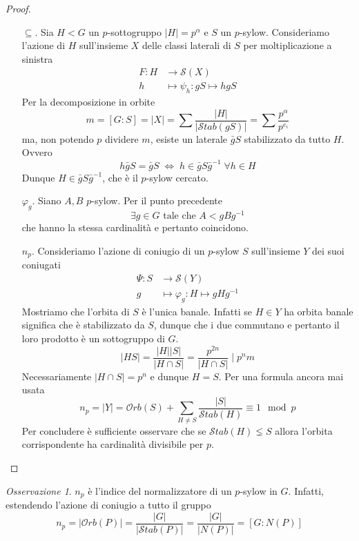 \documentclass[a4paper]{article}
\theoremstyle{remark}
\newtheorem*{remark}{Osservazione}
\theoremstyle{definition}
\newcommand{\Orb}[1]{\mathcal{O}rb\left( #1 \right)}
\newcommand{\Stab}[1]{\mathcal{S}tab\left( #1 \right)}
\newcommand{\fun}[5]{\begin{align*}
	#1 \colon #2 &\to #3 \\
	#4 &\mapsto #5
	\end{align*}}
\begin{document}
\begin{multicols}{2}
\begin{proof}
\begin{itemize}
		\item[$ \subseteq $.] Sia $ H < G $ un $ p $-sottogruppo $ |H| = p^\alpha $ e $ S $ un $ p $-sylow. Consideriamo l'azione di $ H $ sull'insieme $ X $ delle classi laterali di $ S $ per moltiplicazione a sinistra
		\fun{F}{H}{\mathcal{S}(X)}{h}{\psi_h : gS \mapsto hgS}
		Per la decomposizione in orbite
		\[ m=[G:S]=|X| = \sum\frac{|H|}{|\Stab{gS}|} = \sum\frac{p^\alpha}{p^{e_i}} \]
		ma, non potendo $ p $ dividere $ m $, esiste un laterale $ \bar{g}S $ stabilizzato da tutto $ H $. Ovvero
		\[ h\bar{g}S = \bar{g}S \;\Leftrightarrow\; h \in \bar{g}S\bar{g}^{-1} \; \forall h \in H \]
		Dunque $ H \in \bar{g}S\bar{g}^{-1} $, che è il $ p $-sylow cercato.
		
		\item[$ \varphi_g $.] Siano $ A, B $ $ p $-sylow. Per il punto precedente  \[ \exists g \in G \text{ tale che } A < gBg^{-1} \]
		che hanno la stessa cardinalità e pertanto coincidono.
		\item[$ n_p $.] Consideriamo l'azione di coniugio di un $ p $-sylow $ S $ sull'insieme $ Y $ dei suoi coniugati
		\fun{\Psi}{S}{\mathcal{S}(Y)}{g}{\varphi_g: H \mapsto gHg^{-1}}
		Mostriamo che l'orbita di $ S $ è l'unica banale. Infatti se $ H \in Y $ ha orbita banale significa che è stabilizzato da $ S $, dunque che i due commutano e pertanto il loro prodotto è un sottogruppo di $ G $. \[ |HS| = \frac{|H||S|}{|H \cap S|} = \frac{p^{2n}}{|H \cap S|} \mid p^nm \] Necessariamente $ |H \cap S| = p^n $ e dunque $ H = S $. Per una formula ancora mai usata
		\[ n_p = |Y| = \Orb{S} + \sum_{H \neq S}\frac{|S|}{\Stab{H}} \equiv 1 \mod{p} \]
		Per concludere è sufficiente osservare che se $ \Stab{H} \lneq S $ allora l'orbita corrispondente ha cardinalità divisibile per $ p $.
	\end{itemize}
\end{proof}

\begin{remark}
	$ n_p $ è l'indice del normalizzatore di un $ p$-sylow in $ G $. Infatti, estendendo l'azione di coniugio a tutto il gruppo
	\[ n_p = |\Orb{P}| = \frac{|G|}{|\Stab{P}|} = \frac{|G|}{|N(P)|} = [G : N(P)] \]
\end{remark}


\end{multicols}
\end{document}

